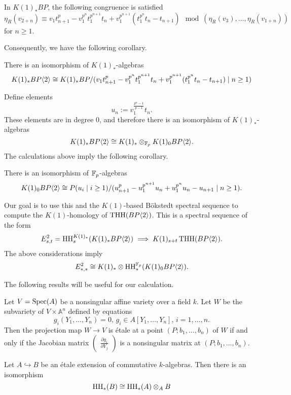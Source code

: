\begin{lem}
	In $K(1)_*BP$, the following congruence is satisfied
	\[
	\eta_R(v_{2+n})\equiv v_1t_{n+1}^p-v_1^{p^n}t_1^{p^{n+1}}t_n+v_1^{p^{n+1}}(t_1^{p^n}t_n-t_{n+1})  \mod(\eta_R(v_3), \ldots, \eta_R(v_{1+n}))
	\]
	for $n\geq 1$.
\end{lem}

Consequently, we have the following corollary. 

\begin{cor}
	There is an isomorphism of $K(1)_*$-algebras
	\[
	K(1)_*BP\langle 2 \rangle\cong K(1)_*BP/(v_1t_{n+1}^p-v_1^{p^n}t_1^{p^{n+1}}t_n+v_1^{p^{n+1}}(t_1^{p^n}t_n-t_{n+1}) \mid n\geq 1)
	\]
\end{cor}

Define elements
\[ u_n:=v_1^{\frac{p^n-1}{p-1}}t_n.\] 
These elements are in degree 0, and therefore there is an isomorphism of $K(1)_*$-algebras
\[
K(1)_*BP\langle 2 \rangle\cong K(1)_*\otimes_{\mathbb{F}_p}K(1)_0BP\langle 2 \rangle.
\]
The calculations above imply the following corollary.

\begin{cor}
	There is an isomorphism of $\mathbb{F}_p$-algebras
	\[
	K(1)_0 BP\langle 2 \rangle \cong P(u_i\mid i\geq 1)/(u_{n+1}^p-u_1^{p^{n+1}}u_n+u_1^{p^n}u_n-u_{n+1}\mid n\geq 1).
	\]
\end{cor}

Our goal is to use this and the $K(1)$-based B\"okstedt spectral sequence to compute the $K(1)$-homology of $\operatorname{THH}(BP\langle 2 \rangle)$. This is a spectral sequence of the form 
\[
E^2_{s,t}= \operatorname{HH}^{K(1)_*}_s(K(1)_*BP\langle 2 \rangle)\implies K(1)_{s+t}\operatorname{THH}(BP\langle 2 \rangle).
\]
The above considerations imply
\[
E_{*,*}^2\cong K(1)_*\otimes \operatorname{HH}_*^{\mathbb{F}_p}(K(1)_0BP\langle 2 \rangle). 
\]

The following results will be useful for our calculation.

\begin{lem}\label{lem:etale}
	Let $V = \operatorname{Spec}(A)$ be a nonsingular affine variety over a field $k$. Let $W$ be the subvariety of $V\times \mathbb{A}^n$ defined by equations
	\[
	g_i(Y_1, \ldots, Y_n)=0, \, g_i\in A[Y_1, \ldots, Y_n],\, i=1,\ldots , n.
	\]
	Then the projection map $W\to V$ is \'etale at a point $(P;b_1, \ldots, b_n)$ of $W$ if and only if the Jacobian matrix $\begin{pmatrix}
		\frac{\partial g_i}{\partial Y_j}
	\end{pmatrix}$ is a nonsingular matrix at $(P; b_1, \ldots , b_n)$.
\end{lem} 

\begin{thm}\label{etaledescent}
	Let $A\hookrightarrow B$ be an \'etale extension of commutative $k$-algebras. Then there is an isomorphism
	\[
	\operatorname{HH}_*(B)\cong \operatorname{HH}_*(A)\otimes_A B
	\]
\end{thm}

